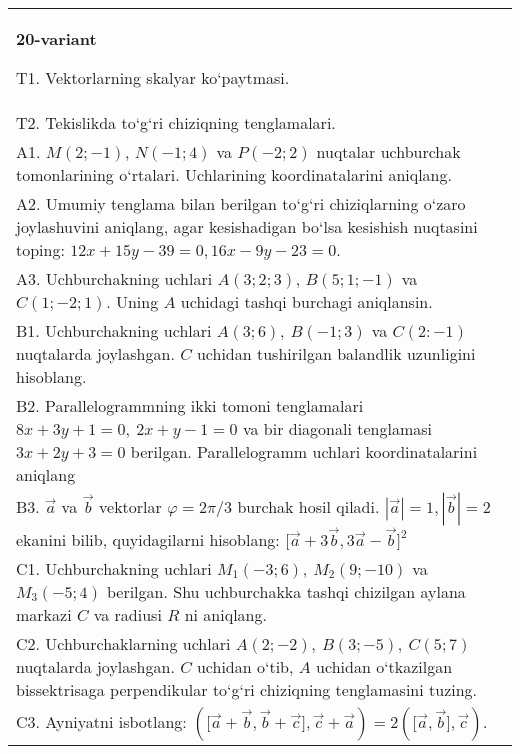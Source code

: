 \documentclass{article}
\begin{document}
\begin{tabular}{m{17cm}}
\textbf{20-variant}
\newline

T1. 
Vektorlarning skalyar ko‘paytmasi.
 \\
T2. 
Tekislikda to‘g‘ri chiziqning tenglamalari.
 \\
A1. 
$M (2;-1) $, $N (-1;4) $ va $P (-2;2) $ nuqtalar
uchburchak tomonlarining o‘rtalari. Uchlarining koordinatalarini
aniqlang.
 \\
A2. 
Umumiy tenglama bilan berilgan to‘g‘ri chiziqlarning
o‘zaro joylashuvini aniqlang, agar kesishadigan bo‘lsa kesishish nuqtasini
toping: $12x+15y-39=0, 16x-9y-23=0$.
 \\
A3. 
Uchburchakning uchlari
$A (3;2; 3) $, $B (5;1; - 1) $ va $C (1; -2;1) $. Uning $A$ uchidagi tashqi burchagi aniqlansin.
 \\
B1. 
Uchburchakning uchlari \(A (3;6),\ B (-1;3) \) va
\(C (2:-1) \) nuqtalarda joylashgan. $C$ uchidan tushirilgan balandlik uzunligini hisoblang.
 \\
B2. 
Parallelogrammning ikki tomoni tenglamalari
\(8x+3y+1=0,\ 2x+y-1=0\) va bir diagonali tenglamasi
\(3x+2y+3=0\) berilgan. Parallelogramm uchlari koordinatalarini
aniqlang
 \\
B3. 
$\vec{a}$ va $\vec{b}$ vektorlar $\varphi = 2\pi/3$ burchak hosil qiladi. $|\vec{a}| = 1,|\vec{b}| = 2$ ekanini bilib, quyidagilarni hisoblang:
$\lbrack\overrightarrow{a} + 3\overrightarrow{b},3\overrightarrow{a} - \overrightarrow{b}\rbrack^{2}$
 \\
C1. 
Uchburchakning uchlari \(M_{1} (- 3;6),\ M_{2} (9; - 10) \)
va \(M_{3} (-5;4) \) berilgan. Shu uchburchakka tashqi chizilgan
aylana markazi $C$ va radiusi $R$ ni aniqlang.
 \\
C2. 
Uchburchaklarning uchlari
\(A (2; - 2),\ B (3; - 5),\ C (5;7) \) nuqtalarda joylashgan. $C$
uchidan o‘tib, $A$ uchidan o‘tkazilgan bissektrisaga
perpendikular to‘g‘ri chiziqning tenglamasini tuzing.
 \\
C3. 
Ayniyatni isbotlang: \((\lbrack\vec{a} + \vec{b},\vec{b} + \vec{c}\rbrack,\vec{c} + \vec{a}) = 2 (\lbrack\vec{a},\vec{b}\rbrack,\vec{c}) \).
 \\

\end{tabular}
\vspace{1cm}
\end{document}
